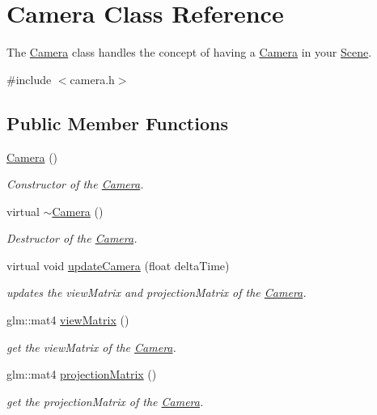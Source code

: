 \hypertarget{class_camera}{}\section{Camera Class Reference}
\label{class_camera}


The \hyperlink{class_camera}{Camera} class handles the concept of having a \hyperlink{class_camera}{Camera} in your \hyperlink{class_scene}{Scene}.  




{\ttfamily \#include $<$camera.\+h$>$}

\subsection*{Public Member Functions}
\begin{DoxyCompactItemize}
\item 
\hyperlink{class_camera_a01f94c3543f56ede7af49dc778f19331}{Camera} ()
\begin{DoxyCompactList}\small\item\em Constructor of the \hyperlink{class_camera}{Camera}. \end{DoxyCompactList}\item 
\mbox{\label{class_camera_ad1897942d0ccf91052386388a497349f}} 
virtual \hyperlink{class_camera_ad1897942d0ccf91052386388a497349f}{$\sim$\+Camera} ()
\begin{DoxyCompactList}\small\item\em Destructor of the \hyperlink{class_camera}{Camera}. \end{DoxyCompactList}\item 
virtual void \hyperlink{class_camera_ac9e359b0a6c41091a0eac46a869790bf}{update\+Camera} (float delta\+Time)
\begin{DoxyCompactList}\small\item\em updates the view\+Matrix and projection\+Matrix of the \hyperlink{class_camera}{Camera}. \end{DoxyCompactList}\item 
glm\+::mat4 \hyperlink{class_camera_aa77dcf47815f0549e40111baf0998771}{view\+Matrix} ()
\begin{DoxyCompactList}\small\item\em get the view\+Matrix of the \hyperlink{class_camera}{Camera}. \end{DoxyCompactList}\item 
glm\+::mat4 \hyperlink{class_camera_a2eca875ed162335c5c8a3907d8674716}{projection\+Matrix} ()
\begin{DoxyCompactList}\small\item\em get the projection\+Matrix of the \hyperlink{class_camera}{Camera}. \end{DoxyCompactList}\end{DoxyCompactItemize}
